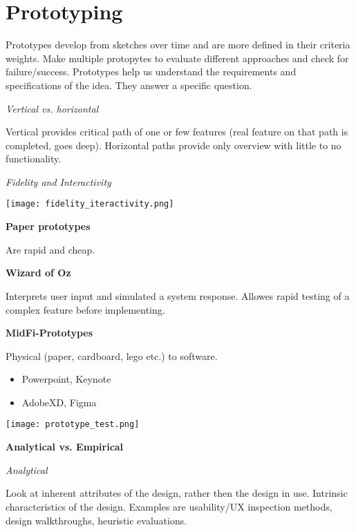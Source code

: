 \section{Prototyping}


Prototypes develop from sketches over time and are more defined in their criteria weights. 
Make multiple protopytes to evaluate different approaches and check for failure/success. Prototypes help us understand the requirements and specifications of the idea.
They answer a specific question. \medskip

\textit{Vertical vs. horizontal} \smallskip

Vertical provides critical path of one or few features (real feature on that path is completed, goes deep). Horizontal paths provide only overview with little to no functionality. \medskip

\textit{Fidelity and Interactivity}

\begin{center}
	\texttt{[image: fidelity\_iteractivity.png]}
\end{center}


\textbf{Paper prototypes} \smallskip

Are rapid and cheap. \medskip

\textbf{Wizard of Oz} \smallskip

Interprets user input and simulated a system response. Allowes rapid testing of a complex feature before implementing. \medskip

\textbf{MidFi-Prototypes} \smallskip

Physical (paper, cardboard, lego etc.) to software. \medskip

\begin{multicols}{2}
    \begin{itemize}[itemsep=-5pt, topsep=-20pt, leftmargin=*]
	\item Powerpoint, Keynote
	\item AdobeXD, Figma
	\end{itemize}
\end{multicols}



\begin{center}
	\texttt{[image: prototype\_test.png]}
\end{center}


\textbf{Analytical vs. Empirical} \smallskip

\textit{Analytical} \smallskip

Look at inherent attributes of the design, rather then the design in use. Intrinsic characteristics of the design. 
Examples are usability/UX inspection methods, design walkthroughs, heuristic evaluations. \medskip

